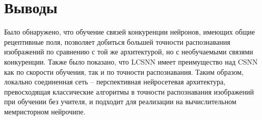 \documentclass[a4paper]{article}
\begin{document}
\section{Выводы}
Было обнаружено, что обучение связей конкуренции нейронов, имеющих общие рецептивные поля, позволяет добиться большей точности распознавания изображений по сравнению с той же архитектурой, но с необучаемыми связями конкуренции. Также было показано, что LCSNN имеет преимущество над CSNN как по скорости обучения, так и по точности распознавания. Таким образом, локально соединенная сеть – перспективная нейросетевая архитектура, превосходящая классические алгоритмы в точности распознавания изображений при обучении без учителя, и подходит для реализации на вычислительном мемристорном нейрочипе.

\printbibliography
\end{document}
